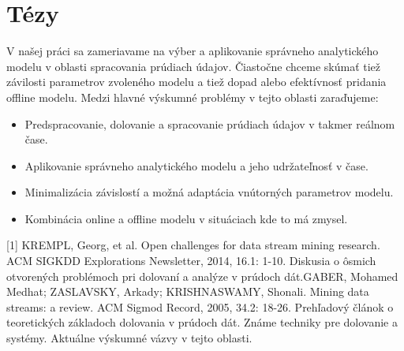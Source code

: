 \documentclass[11pt]{article}
\begin{document}
\section{Tézy}
V našej práci sa zameriavame na výber a aplikovanie správneho analytického modelu v oblasti spracovania prúdiach údajov. Čiastočne chceme skúmať tiež závilosti parametrov zvoleného modelu a tiež dopad alebo efektívnosť pridania offline modelu. Medzi hlavné výskumné problémy v tejto oblasti zaraďujeme:
\begin{itemize}
	\item Predspracovanie, dolovanie a spracovanie prúdiach údajov v takmer reálnom čase.
	\item Aplikovanie správneho analytického modelu a jeho udržateľnosť v čase.
	\item Minimalizácia závislostí a možná adaptácia vnútorných parametrov modelu.
	\item Kombinácia online a offline modelu v situáciach kde to má zmysel.
\end{itemize}
[1] KREMPL, Georg, et al. Open challenges for data stream mining research. ACM SIGKDD Explorations Newsletter, 2014, 16.1: 1-10. \newline
Diskusia o ôsmich otvorených problémoch pri dolovaní a analýze v prúdoch dát.\newline
[2] GABER, Mohamed Medhat; ZASLAVSKY, Arkady; KRISHNASWAMY, Shonali. Mining data streams: a review. ACM Sigmod Record, 2005, 34.2: 18-26. \newline
	Prehľadový článok o teoretických základoch dolovania v prúdoch dát. Známe techniky pre dolovanie a systémy. Aktuálne výskumné vázvy v tejto oblasti.
\end{document}

